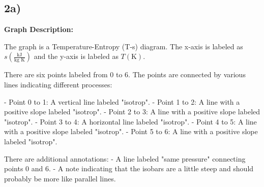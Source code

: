 

\subsection*{2a)}

\begin{center}
\textbf{Graph Description:}
\end{center}

The graph is a Temperature-Entropy (T-s) diagram. The x-axis is labeled as \( s \left( \frac{\text{kJ}}{\text{kg K}} \right) \) and the y-axis is labeled as \( T \left( \text{K} \right) \). 

There are six points labeled from 0 to 6. The points are connected by various lines indicating different processes:

- Point 0 to 1: A vertical line labeled "isotrop".
- Point 1 to 2: A line with a positive slope labeled "isotrop".
- Point 2 to 3: A line with a positive slope labeled "isotrop".
- Point 3 to 4: A horizontal line labeled "isotrop".
- Point 4 to 5: A line with a positive slope labeled "isotrop".
- Point 5 to 6: A line with a positive slope labeled "isotrop".

There are additional annotations:
- A line labeled "same pressure" connecting points 0 and 6.
- A note indicating that the isobars are a little steep and should probably be more like parallel lines.